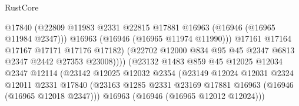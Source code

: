 \begin{lexlean}{RustCore}
\begin{coremodule}
                                          @17840
                                          (@22809
                                            @11983
                                            @2331
                                            @22815
                                            @17881
                                            @16963
                                            (@16946 (@16965 @11984 @2347)))
                                          @16963
                                          (@16946 (@16965 @11974 @11990)))
                                        @17161
                                        @17164
                                        @17167
                                        @17171
                                        @17176
                                        @17182)
                                      (@22702
                                        @12000
                                        @834
                                        @95
                                        @45
                                        @2347
                                        @6813
                                        @2347
                                        @2442
                                        @27353
                                        @23008))))
                                (@23132
                                  @1483
                                  @859
                                  @45
                                  @12025
                                  @12034
                                  @2347
                                  @12114
                                  (@23142
                                    @12025
                                    @12032
                                    @2354
                                    (@23149
                                      @12024
                                      @12031
                                      @2324
                                      @12011
                                      @2331
                                      @17840
                                      (@23163
                                        @1285
                                        @2331
                                        @23169
                                        @17881
                                        @16963
                                        (@16946 (@16965 @12018 @2347)))
                                      @16963
                                      (@16946 (@16965 @12012 @12024)))

\end{coremodule}
\end{lexlean}
